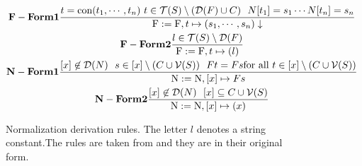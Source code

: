 \begin{figure}
\begin{minipage}{1.0\textwidth}
\scriptsize
\begin{gather*}\label{eA1}
 \bold{F-Form1} \frac
 { t = \textnormal{con}(t_1, \cdots,t_n) \ t \in \mathcal{T}(S) \setminus ( \mathcal{D}(F) \cup C)  \ \  N[t_1] = s_1 \cdots N[t_n] = s_n }
 { \textnormal{F} := \textnormal{F}, t \mapsto ( s_1, \cdots, s_n) \downarrow}\\
 \bold{F-Form2} \frac
 { l \in \mathcal{T}(S) \setminus \mathcal{D}(F)}
 { \textnormal{F} := \textnormal{F}, t \mapsto ( l)} \\
  \bold{N-Form1} \frac
  { [x] \not\in \mathcal{D}(N) \ \ s \in [x] \setminus ( C \cup \mathcal{V}(S)) \ \ F t= F s \textnormal{for all} \ t \in [x] \setminus ( C \cup \mathcal{V}(S)) }
  { \textnormal{N}:= \textnormal{N}, [x] \mapsto F s}\\
  \bold{N-Form2} \frac
  { [x] \not\in \mathcal{D}(N) \ \ [x] \subseteq  C \cup \mathcal{V}(S)} 
  { \textnormal{N}:= \textnormal{N}, [x] \mapsto (x)}
\end{gather*}
\null
\par\xdef\tpd{\the\prevdepth}
\end{minipage}
\caption{Normalization derivation rules. The letter \(l\) denotes a string constant.The rules are taken from \cite{main-paper} and they are in their original form.}
\label{rules_3}
\end{figure}